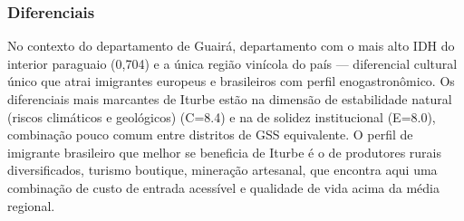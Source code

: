 \subsubsection*{Diferenciais}\label{dif-iturbe-0409}
No contexto do departamento de Guairá, departamento com o mais alto IDH do interior paraguaio (0,704) e a única região vinícola do país — diferencial cultural único que atrai imigrantes europeus e brasileiros com perfil enogastronômico. Os diferenciais mais marcantes de Iturbe estão na dimensão de estabilidade natural (riscos climáticos e geológicos) (C=8.4) e na de solidez institucional (E=8.0), combinação pouco comum entre distritos de GSS equivalente. O perfil de imigrante brasileiro que melhor se beneficia de Iturbe é o de produtores rurais diversificados, turismo boutique, mineração artesanal, que encontra aqui uma combinação de custo de entrada acessível e qualidade de vida acima da média regional.
